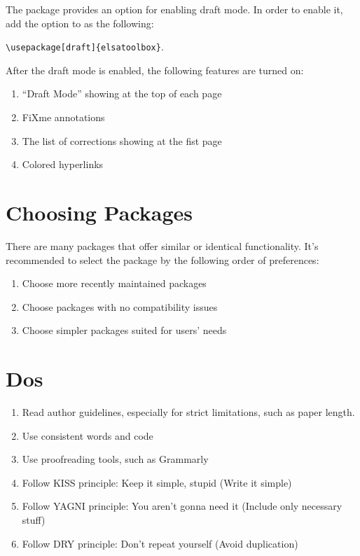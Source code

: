 The \elsatoolbox{} package provides an option for enabling draft mode. In order to enable it, add the option  to \elsatoolbox{} as the following:

\begin{center}
    \verb|\usepackage[draft]{elsatoolbox}|.
\end{center}

After the draft mode is enabled, the following features are turned on:

\begin{enumerate}
    \item ``Draft Mode'' showing at the top of each page
    \item FiXme annotations
    \item The list of corrections showing at the fist page
    \item Colored hyperlinks
\end{enumerate}

\section*{Choosing Packages}

There are many packages that offer similar or identical functionality. It's recommended to select the package by the following order of preferences:

\begin{enumerate}
    \item Choose more recently maintained packages
    \item Choose packages with no compatibility issues
    \item Choose simpler packages suited for users' needs
\end{enumerate}

\section*{Dos}

\begin{enumerate}
    \item Read author guidelines, especially for strict limitations, such as paper length.
    \item Use consistent words and code
    \item Use proofreading tools, such as Grammarly
    \item Follow KISS principle: Keep it simple, stupid (Write it simple)
    \item Follow YAGNI principle: You aren't gonna need it (Include only necessary stuff)
    \item Follow DRY principle: Don't repeat yourself (Avoid duplication)
\end{enumerate}

